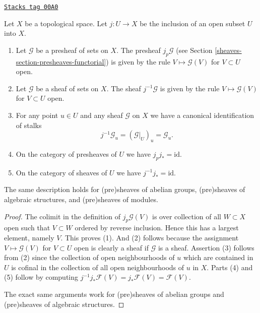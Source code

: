 \begin{lemma}[J pullback]
\label{sheaves-lemma-j-pullback}
\href{https://stacks.math.columbia.edu/tag/00A0}{\texttt{Stacks tag 00A0}}

Let $X$ be a topological space.
Let $j : U \to X$ be the inclusion of an open subset $U$ into $X$.
\begin{enumerate}
\item Let $\mathcal{G}$ be a presheaf of sets on $X$.
The presheaf $j_p\mathcal{G}$
(see Section \ref{sheaves-section-presheaves-functorial}) is given by the rule
$V \mapsto \mathcal{G}(V)$ for $V \subset U$ open.
\item Let $\mathcal{G}$ be a sheaf of sets on $X$.
The sheaf $j^{-1}\mathcal{G}$ is given by the rule
$V \mapsto \mathcal{G}(V)$ for $V \subset U$ open.
\item For any point $u \in U$ and any sheaf $\mathcal{G}$ on $X$
we have a canonical identification of stalks
$$
j^{-1}\mathcal{G}_u = (\mathcal{G}|_U)_u = \mathcal{G}_u.
$$
\item On the category of presheaves of $U$ we have $j_pj_* = \text{id}$.
\item On the category of sheaves of $U$ we have $j^{-1}j_* = \text{id}$.
\end{enumerate}
The same description holds for (pre)sheaves of abelian groups,
(pre)sheaves of algebraic structures, and (pre)sheaves of modules.
\end{lemma}

\begin{proof}
The colimit in the definition of $j_p\mathcal{G}(V)$
is over collection of all $W \subset X$ open such that $V \subset W$
ordered by reverse inclusion.
Hence this has a largest element, namely $V$. This proves (1).
And (2) follows because the assignment $V \mapsto \mathcal{G}(V)$
for $V \subset U$ open is clearly a sheaf if $\mathcal{G}$ is a
sheaf. Assertion (3) follows from (2) since the collection
of open neighbourhoods of $u$ which are contained in $U$ is cofinal
in the collection of all open neighbourhoods of $u$ in $X$.
Parts (4) and (5) follow by computing
$j^{-1}j_*\mathcal{F}(V) = j_*\mathcal{F}(V) = \mathcal{F}(V)$.

\medskip\noindent
The exact same arguments work for (pre)sheaves of abelian groups
and (pre)sheaves of algebraic structures.
\end{proof}

